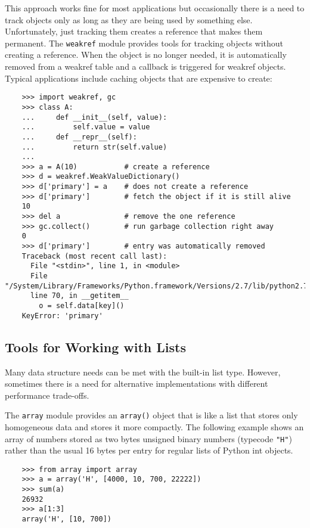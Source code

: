 \documentclass[UTF8]{article}
\begin{document}
This approach works fine for most applications but occasionally there is a need to track objects
only as long as they are being used by something else. Unfortunately, just tracking them creates a
reference that makes them permanent. The \texttt{weakref} module provides tools for tracking
objects without creating a reference. When the object is no longer needed, it is automatically
removed from a weakref table and a callback is triggered for weakref objects. Typical applications
include caching objects that are expensive to create:
\begin{verbatim}
    >>> import weakref, gc
    >>> class A:
    ...     def __init__(self, value):
    ...         self.value = value
    ...     def __repr__(self):
    ...         return str(self.value)
    ...
    >>> a = A(10)           # create a reference
    >>> d = weakref.WeakValueDictionary()
    >>> d['primary'] = a    # does not create a reference
    >>> d['primary']        # fetch the object if it is still alive
    10
    >>> del a               # remove the one reference
    >>> gc.collect()        # run garbage collection right away
    0
    >>> d['primary']        # entry was automatically removed
    Traceback (most recent call last):
      File "<stdin>", line 1, in <module>
      File "/System/Library/Frameworks/Python.framework/Versions/2.7/lib/python2.7/weakref.py",
      line 70, in __getitem__
        o = self.data[key]()
    KeyError: 'primary'
\end{verbatim}

\subsection{Tools for Working with Lists}
Many data structure needs can be met with the built-in list type. However, sometimes there is a
need for alternative implementations with different performance trade-offs.

The \texttt{array} module provides an \texttt{array()} object that is like a list that stores only
homogeneous data and stores it more compactly. The following example shows an array of numbers
stored as two bytes unsigned binary numbers (typecode \texttt{"H"}) rather than the usual 16 bytes
per entry for regular lists of Python int objects.
\begin{verbatim}
    >>> from array import array
    >>> a = array('H', [4000, 10, 700, 22222])
    >>> sum(a)
    26932
    >>> a[1:3]
    array('H', [10, 700])
\end{verbatim}
\end{document}

